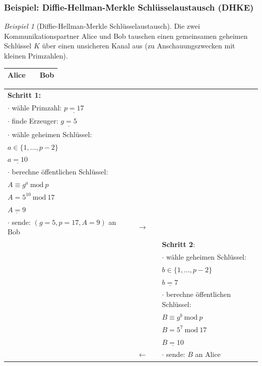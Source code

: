 \documentclass[
  a4paper,
  11pt,
]{scrartcl}
\theoremstyle{plain}
\theoremstyle{definition}
\theoremstyle{remark}
\newtheorem{beispiel}{Beispiel}
\newcommand{\Mod}[1]{\ \mathrm{mod}\ #1}
\begin{document}
\subsubsection{Beispiel: Diffie-Hellman-Merkle Schlüsselaustausch (DHKE)}
\label{sub:dhke_beispiel}
\begin{beispiel}[Diffie-Hellman-Merkle Schlüsselaustausch]\label{bsp:dhke}
  Die zwei Kommunikationspartner Alice und Bob tauschen einen gemeinsamen
  geheimen Schlüssel $K$ über einen unsicheren Kanal aus (zu Anschauungszwecken
  mit kleinen Primzahlen).
  \begin{center}
    \begin{tabularx}{\textwidth}{lXr}
      \textbf{Alice} & & \textbf{Bob}\\
      \midrule
    \end{tabularx}
    \begin{tabularx}{\textwidth}{lXcXl}
      \textbf{Schritt 1:} & & & & \\
      $\cdot$ wähle Primzahl: $\underline{p = 17}$ & & & & \\
      $\cdot$ finde Erzeuger: $\underline{g = 5}$ & & & & \\
      $\cdot$ wähle geheimen Schlüssel: & & & & \\
      $a \in \{1, \dots, p-2\}$ & & & & \\
      $\underline{a = 10}$ & & & & \\
      $\cdot$ berechne öffentlichen Schlüssel: & & & & \\
      $A \equiv g^a \Mod{p}$ & & & & \\
      $A = 5^{10} \Mod{17}$ & & & & \\
      $\underline{A = 9}$ & & & & \\
      $\cdot$ sende: $(g = 5, p = 17, A = 9)$ an Bob & & $\to$ & & \\\midrule
      & & & & \textbf{Schritt 2}:\\
      & & & & $\cdot$ wähle geheimen Schlüssel:\\
      & & & & $b \in \{1, \dots, p-2\}$\\
      & & & & $\underline{b=7}$\\
      & & & & $\cdot$ berechne öffentlichen Schlüssel:\\
      & & & & $B \equiv g^b \Mod{p}$\\
      & & & & $B = 5^7 \Mod{17}$\\
      & & & & $\underline{B = 10}$\\
      & & $\leftarrow$ & & $\cdot$ sende: $B$ an Alice\\\midrule

\end{tabularx}
\end{center}
\end{beispiel}
\end{document}
